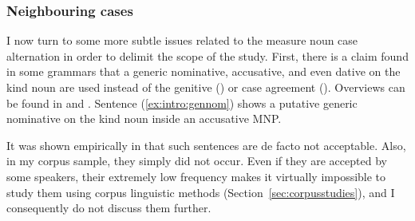 \subsubsection{Neighbouring cases}
\label{sec:neighbouringcases}

% 
%

I now turn to some more subtle issues related to the measure noun case alternation in order to delimit the scope of the study.
First, there is a claim found in some grammars that a generic nominative, accusative, and even dative on the kind noun are used instead of the genitive (\PGCa) or case agreement (\NACa).
Overviews can be found in \cite{Hentschel1993} and \cite{Zimmer2015}.
Sentence (\ref{ex:intro:gennom}) shows a putative generic nominative on the kind noun inside an accusative MNP.

\begin{exe}
\end{exe}

It was shown empirically in \cite{Hentschel1993} that such sentences are de facto not acceptable.
Also, in my corpus sample, they simply did not occur.
Even if they are accepted by some speakers, their extremely low frequency makes it virtually impossible to study them using corpus linguistic methods (Section~\ref{sec:corpusstudies}), and I consequently do not discuss them further.


